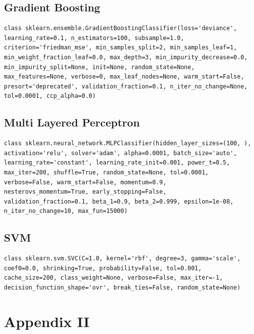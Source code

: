 \documentclass[12pt]{article}
\begin{document}
\subsection{Gradient Boosting}
\begin{lstlisting}
class sklearn.ensemble.GradientBoostingClassifier(loss='deviance', learning_rate=0.1, n_estimators=100, subsample=1.0, criterion='friedman_mse', min_samples_split=2, min_samples_leaf=1, min_weight_fraction_leaf=0.0, max_depth=3, min_impurity_decrease=0.0, min_impurity_split=None, init=None, random_state=None, max_features=None, verbose=0, max_leaf_nodes=None, warm_start=False, presort='deprecated', validation_fraction=0.1, n_iter_no_change=None, tol=0.0001, ccp_alpha=0.0)
\end{lstlisting}

\newpage
\subsection{Multi Layered Perceptron}
\begin{lstlisting}
class sklearn.neural_network.MLPClassifier(hidden_layer_sizes=(100, ), activation='relu', solver='adam', alpha=0.0001, batch_size='auto', learning_rate='constant', learning_rate_init=0.001, power_t=0.5, max_iter=200, shuffle=True, random_state=None, tol=0.0001, verbose=False, warm_start=False, momentum=0.9, nesterovs_momentum=True, early_stopping=False, validation_fraction=0.1, beta_1=0.9, beta_2=0.999, epsilon=1e-08, n_iter_no_change=10, max_fun=15000)
\end{lstlisting}

\subsection{SVM}
\begin{lstlisting}
class sklearn.svm.SVC(C=1.0, kernel='rbf', degree=3, gamma='scale', coef0=0.0, shrinking=True, probability=False, tol=0.001, cache_size=200, class_weight=None, verbose=False, max_iter=-1, decision_function_shape='ovr', break_ties=False, random_state=None)
\end{lstlisting}
\clearpage

\section{Appendix II}
\end{document}
